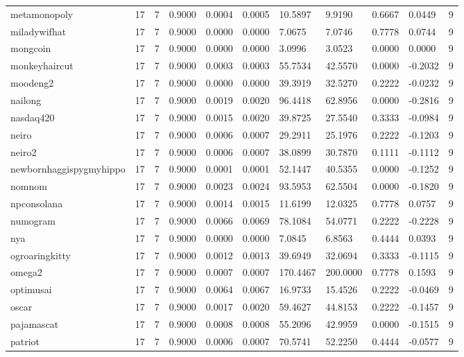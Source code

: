 \begin{table}[htbp]
\begin{tabular}{lllllllllll}
metamonopoly & 17 & 7 & 0.9000 & 0.0004 & 0.0005 & 10.5897 & 9.9190 & 0.6667 & 0.0449 & 9 \\
miladywifhat & 17 & 7 & 0.9000 & 0.0000 & 0.0000 & 7.0675 & 7.0746 & 0.7778 & 0.0744 & 9 \\
mongcoin & 17 & 7 & 0.9000 & 0.0000 & 0.0000 & 3.0996 & 3.0523 & 0.0000 & 0.0000 & 9 \\
monkeyhaircut & 17 & 7 & 0.9000 & 0.0003 & 0.0003 & 55.7534 & 42.5570 & 0.0000 & -0.2032 & 9 \\
moodeng2 & 17 & 7 & 0.9000 & 0.0000 & 0.0000 & 39.3919 & 32.5270 & 0.2222 & -0.0232 & 9 \\
nailong & 17 & 7 & 0.9000 & 0.0019 & 0.0020 & 96.4418 & 62.8956 & 0.0000 & -0.2816 & 9 \\
nasdaq420 & 17 & 7 & 0.9000 & 0.0015 & 0.0020 & 39.8725 & 27.5540 & 0.3333 & -0.0984 & 9 \\
neiro & 17 & 7 & 0.9000 & 0.0006 & 0.0007 & 29.2911 & 25.1976 & 0.2222 & -0.1203 & 9 \\
neiro2 & 17 & 7 & 0.9000 & 0.0006 & 0.0007 & 38.0899 & 30.7870 & 0.1111 & -0.1112 & 9 \\
newbornhaggispygmyhippo & 17 & 7 & 0.9000 & 0.0001 & 0.0001 & 52.1447 & 40.5355 & 0.0000 & -0.1252 & 9 \\
nomnom & 17 & 7 & 0.9000 & 0.0023 & 0.0024 & 93.5953 & 62.5504 & 0.0000 & -0.1820 & 9 \\
npconsolana & 17 & 7 & 0.9000 & 0.0014 & 0.0015 & 11.6199 & 12.0325 & 0.7778 & 0.0757 & 9 \\
numogram & 17 & 7 & 0.9000 & 0.0066 & 0.0069 & 78.1084 & 54.0771 & 0.2222 & -0.2228 & 9 \\
nya & 17 & 7 & 0.9000 & 0.0000 & 0.0000 & 7.0845 & 6.8563 & 0.4444 & 0.0393 & 9 \\
ogroaringkitty & 17 & 7 & 0.9000 & 0.0012 & 0.0013 & 39.6949 & 32.0694 & 0.3333 & -0.1115 & 9 \\
omega2 & 17 & 7 & 0.9000 & 0.0007 & 0.0007 & 170.4467 & 200.0000 & 0.7778 & 0.1593 & 9 \\
optimusai & 17 & 7 & 0.9000 & 0.0064 & 0.0067 & 16.9733 & 15.4526 & 0.2222 & -0.0469 & 9 \\
oscar & 17 & 7 & 0.9000 & 0.0017 & 0.0020 & 59.4627 & 44.8153 & 0.2222 & -0.1457 & 9 \\
pajamascat & 17 & 7 & 0.9000 & 0.0008 & 0.0008 & 55.2096 & 42.9959 & 0.0000 & -0.1515 & 9 \\
patriot & 17 & 7 & 0.9000 & 0.0006 & 0.0007 & 70.5741 & 52.2250 & 0.4444 & -0.0577 & 9 \\

\end{tabular}
\end{table}
